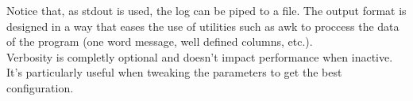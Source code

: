   Notice that, as stdout is used, the log can be piped to a file. The
  output format is designed in a way that eases the use of utilities such as
  awk to proccess the data of the program (one word message, well defined
  columns, etc.).\\

  Verbosity is completly optional and doesn't impact performance when inactive.
  It's particularly useful when tweaking the parameters to get the best
  configuration.\\
